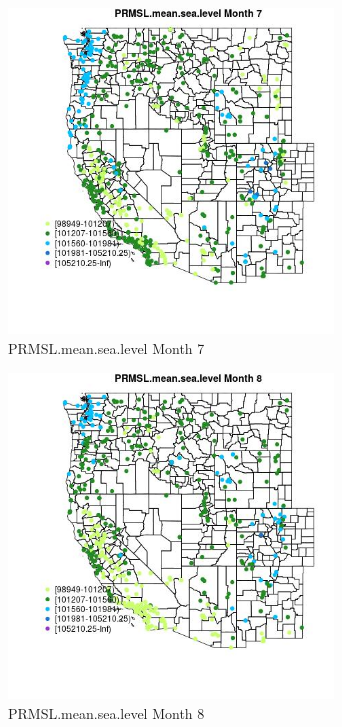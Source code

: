 \begin{figure} 
\centering  
\includegraphics[width=0.77\textwidth]{Code_Outputs/Report_ML_input_PM25_Step4_part_e_de_duplicated_aves_compiled_2019-05-14wNAs_MapObsMo7PRMSLmeansealevel.jpg} 
\caption{\label{fig:Report_ML_input_PM25_Step4_part_e_de_duplicated_aves_compiled_2019-05-14wNAsMapObsMo7PRMSLmeansealevel}PRMSL.mean.sea.level Month 7} 
\end{figure} 
 

\begin{figure} 
\centering  
\includegraphics[width=0.77\textwidth]{Code_Outputs/Report_ML_input_PM25_Step4_part_e_de_duplicated_aves_compiled_2019-05-14wNAs_MapObsMo8PRMSLmeansealevel.jpg} 
\caption{\label{fig:Report_ML_input_PM25_Step4_part_e_de_duplicated_aves_compiled_2019-05-14wNAsMapObsMo8PRMSLmeansealevel}PRMSL.mean.sea.level Month 8} 
\end{figure} 
 

